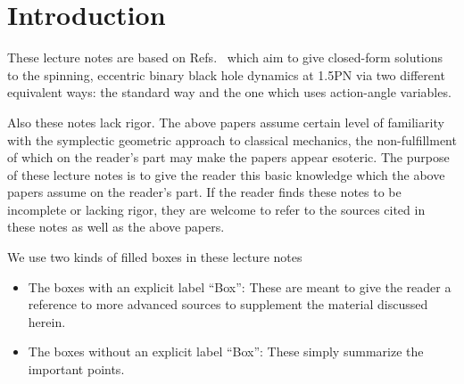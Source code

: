 \chapter{Introduction}



These lecture notes are based on Refs.~\cite{tanay2021action, tanay2021integrability, Cho:2019brd} which aim to give closed-form solutions to the spinning, eccentric
binary black hole dynamics at 1.5PN via two different equivalent ways:
the standard way and the one which uses action-angle variables.



Also these notes lack rigor. The above papers assume certain level of familiarity
with the symplectic geometric approach to classical mechanics, the non-fulfillment
of which on the reader's part may make the papers appear esoteric.
The purpose of these lecture notes is to give the reader this basic knowledge
which the above papers assume on the reader's part. If the reader 
finds these notes to be incomplete or lacking rigor, they are welcome to
refer to the sources cited in these notes as well as the above papers.



We use two kinds of filled boxes in these lecture notes
\begin{itemize}
\item The boxes with an explicit label ``Box'': These are meant
to give the reader a reference to more advanced sources to supplement
the material discussed herein. 
\item The boxes without an explicit label ``Box'': These simply 
summarize the important points.
\end{itemize}